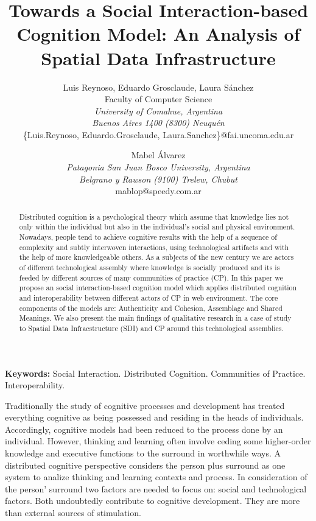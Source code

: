\documentclass[10pt,twocolumn,ieeetran]{article}
\title{Towards a Social Interaction-based Cognition Model: An Analysis of Spatial Data Infrastructure}
\author{Luis Reynoso, Eduardo Grosclaude, Laura S\' anchez \\
Faculty of Computer Science\\ {\it University of Comahue, Argentina} \\
{\it Buenos Aires 1400 (8300) Neuqu\'en}\\ \{Luis.Reynoso, Eduardo.Grosclaude,  Laura.Sanchez\}@fai.uncoma.edu.ar\\
\and
Mabel \' Alvarez\\
{\it Patagonia San Juan Bosco University, Argentina}\\
{\it Belgrano y Rawson (9100) Trelew, Chubut}\\
mablop@speedy.com.ar\\
}
\begin{document}
\maketitle
\thispagestyle{empty}




\begin{abstract}
Distributed cognition is a psychological theory which assume that knowledge lies not only within the individual but also in the individual's social and physical environment. Nowadays, people tend to achieve cognitive results with the help of a sequence of complexity and subtly interwoven interactions, using technological artifacts and with the help of more knowledgeable others. As a subjects of the new century we are actors of different technological assembly where knowledge is socially produced and its is feeded by different sources of many communities of practice (CP). In this paper we propose an social interaction-based cognition model which applies distributed cognition and interoperability between different actors of CP in web environment. The core components of the models are: Authenticity and Cohesion, Assemblage and Shared Meanings. We also present the main findings of qualitative research in a case of study to Spatial Data Infraestructure (SDI) and CP around this technological assemblies. 

\end{abstract}

{\bf Keywords:} Social Interaction. Distributed Cognition. Communities of Practice. Interoperability. 




Traditionally the study of cognitive processes \cite{Wang2005} and development has treated everything cognitive as being possessed and residing in the heads of individuals. Accordingly, cognitive models had been reduced
to the process done by an individual.  
However, thinking and learning often involve ceding some higher-order knowledge and executive functions to the surround in worthwhile ways. A distributed cognitive perspective considers the person plus surround as one system to analize  thinking and learning contexts and process. 
In consideration of the person' surround two factors are needed to focus on:
social and technological factors. Both undoubtedly contribute to cognitive development. They are more than external sources of stimulation.
\end{document}
